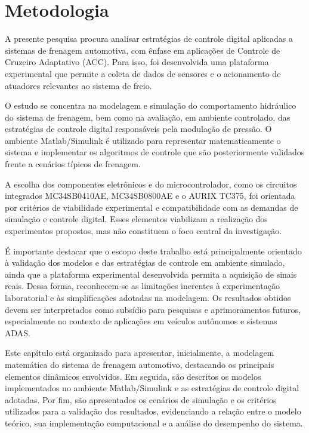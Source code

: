 \chapter{Metodologia}
\label{chap:metodologia}
A presente pesquisa procura analisar estratégias de controle digital aplicadas a sistemas de frenagem automotiva, com ênfase em aplicações de Controle de Cruzeiro Adaptativo (ACC). Para isso, foi desenvolvida uma plataforma experimental que permite a coleta de dados de sensores e o acionamento de atuadores relevantes ao sistema de freio. 

O estudo se concentra na modelagem e simulação do comportamento hidráulico do sistema de frenagem, bem como na avaliação, em ambiente controlado, das estratégias de controle digital responsáveis pela modulação de pressão. O ambiente Matlab/Simulink é utilizado para representar matematicamente o sistema e implementar os algoritmos de controle que são posteriormente validados frente a cenários típicos de frenagem.

A escolha dos componentes eletrônicos e do microcontrolador, como os circuitos integrados MC34SB0410AE, MC34SB0800AE e o AURIX TC375, foi orientada por critérios de viabilidade experimental e compatibilidade com as demandas de simulação e controle digital. Esses elementos viabilizam a realização dos experimentos propostos, mas não constituem o foco central da investigação.


É importante destacar que o escopo deste trabalho está principalmente orientado à validação dos modelos e das estratégias de controle em ambiente simulado, ainda que a plataforma experimental desenvolvida permita a aquisição de sinais reais. Dessa forma, reconhecem‑se as limitações inerentes à experimentação laboratorial e às simplificações adotadas na modelagem. Os resultados obtidos devem ser interpretados como subsídio para pesquisas e aprimoramentos futuros, especialmente no contexto de aplicações em veículos autônomos e sistemas ADAS.

Este capítulo está organizado para apresentar, inicialmente, a modelagem matemática do sistema de frenagem automotivo, destacando os principais elementos dinâmicos envolvidos. Em seguida, são descritos os modelos implementados no ambiente Matlab/Simulink e as estratégias de controle digital adotadas. Por fim, são apresentados os cenários de simulação e os critérios utilizados para a validação dos resultados, evidenciando a relação entre o modelo teórico, sua implementação computacional e a análise do desempenho do sistema.

